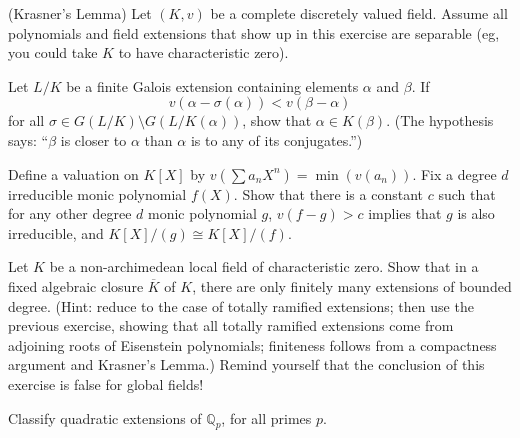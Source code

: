 \documentclass[11pt,answers,addpoints,reqno]{exam}
\theoremstyle{definition}
\theoremstyle{remark}
\theoremstyle{definition}
\theoremstyle{remark}
\theoremstyle{remark}
\newcommand{\Q}{\mathbb{Q}}
\begin{document}
\begin{questions}

\question (Krasner's Lemma) Let $(K, v)$ be a complete discretely valued field.
Assume all polynomials and field extensions that show up in this exercise are separable (eg, you could take $K$ to have characteristic zero).
\begin{parts}
\item Let $L/K$ be a finite Galois extension containing elements $\alpha$ and $\beta$. If 
\[
v(\alpha-\sigma(\alpha)) < v(\beta-\alpha)
\]
for all $\sigma \in G(L/K) \setminus G(L/K(\alpha))$, show that $\alpha \in K(\beta)$. (The hypothesis says: ``$\beta$ is closer to $\alpha$ than $\alpha$ is to any of its conjugates.'')
\item Define a valuation on $K[X]$ by $v(\sum a_n X^n)= \min(v(a_n))$. Fix a degree $d$ irreducible monic polynomial $f(X)$. Show that there is a constant $c$ such that for any other degree $d$ monic polynomial $g$, $v(f-g)>c$ implies that $g$ is also irreducible, and $K[X]/(g) \cong K[X]/(f)$.
\item Let $K$ be a non-archimedean local field of characteristic zero. Show that in a fixed algebraic closure $\overline{K}$ of $K$, there are only finitely many extensions of bounded degree. (Hint: reduce to the case of totally ramified extensions; then use the previous exercise, showing that all totally ramified extensions come from adjoining roots of Eisenstein polynomials; finiteness follows from a compactness argument and Krasner's Lemma.) Remind yourself that the conclusion of this exercise is false for global fields!
\end{parts}

\question Classify quadratic extensions of $\Q_p$, for all primes $p$.
\end{questions}
\end{document}
